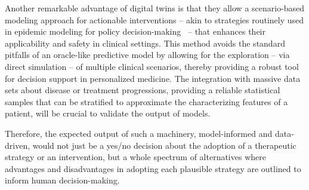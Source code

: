 \documentclass[12pt]{article}
\renewcommand{\(}{\left(}
\renewcommand{\)}{\right)}
\renewcommand{\[}{\left[}
\renewcommand{\]}{\right]}
\newcommand{\rev}[1]{{\color{red} #1}}
\begin{document}
Another remarkable advantage of digital twins is that they allow a scenario-based modeling approach for actionable interventions -- akin to strategies routinely used in epidemic modeling for policy decision-making~\cite{hofman2021integrating} -- that enhances their applicability and safety in clinical settings. This method avoids the standard pitfalls of an oracle-like predictive model by allowing for the exploration -- via direct simulation -- of multiple clinical scenarios, thereby providing a robust tool for decision support in personalized medicine. The integration with massive data sets about disease or treatment progressions, providing a reliable statistical samples that can be stratified to approximate the characterizing features of a patient, will be crucial to validate the output of models.

Therefore, the expected output of such a machinery, model-informed and data-driven, would not just be a yes/no decision about the adoption of a therapeutic strategy or an intervention, but a whole spectrum of alternatives where advantages and disadvantages in adopting each plausible strategy are outlined to inform human decision-making.








\end{document}
